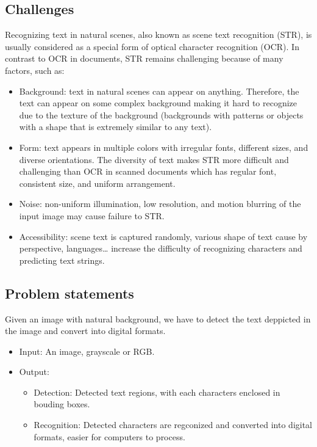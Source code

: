 \documentclass[conference]{IEEEtran}
\begin{document}
\subsection{Challenges}

Recognizing text in natural scenes, also known as scene text recognition (STR), is usually considered as a special form of optical character recognition (OCR). In contrast to OCR in documents, STR remains challenging because of many factors, such as:

\begin{itemize}
    \item Background: text in natural scenes can appear on anything. Therefore, the text can appear on some complex background making it hard to recognize due to the texture of the background (backgrounds with patterns or objects with a shape that is extremely similar to any text).
    \item Form: text appears in multiple colors with irregular fonts, different sizes, and diverse orientations. The diversity of text makes STR more difficult and challenging than OCR in scanned documents which has regular font, consistent size, and uniform arrangement.
    \item Noise: non-uniform illumination, low resolution, and motion blurring of the input image may cause failure to STR.
    \item Accessibility: scene text is captured randomly, various shape of text cause by perspective, languages…  increase the difficulty of recognizing characters and predicting text strings.
\end{itemize}

\subsection{Problem statements}

Given an image with natural background, we have to detect the text deppicted in the image and convert into digital formats.

\begin{itemize}
    \item Input: An image, grayscale or RGB.
    \item Output: 
        \begin{itemize}
            \item Detection: Detected text regions, with each characters enclosed in bouding boxes.
            \item Recognition: Detected characters are regconized and converted into digital formats, easier for computers to process.
        \end{itemize}
\end{itemize}
\end{document}
